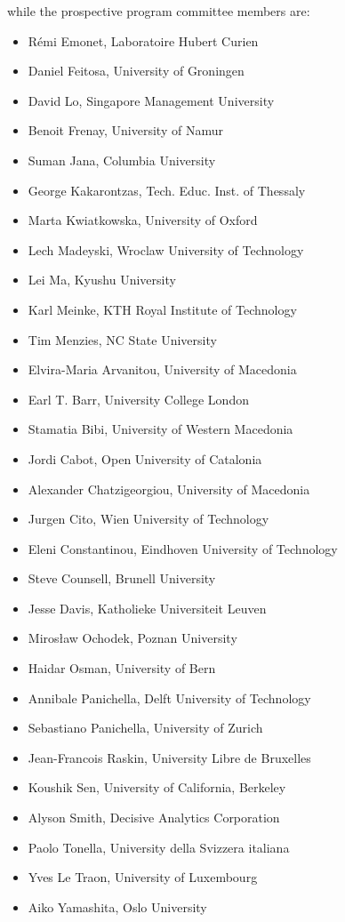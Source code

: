 \smallskip
\noindent while the prospective program committee members are:

\begin{itemize}[topsep=0.5em, itemsep=0.5em]
	\item Rémi Emonet, Laboratoire Hubert Curien
	\item Daniel Feitosa, University of Groningen
    \item David Lo, Singapore Management University
	\item Benoit Frenay, University of Namur
	\item Suman Jana, Columbia University
    \item George Kakarontzas, Tech. Educ. Inst. of Thessaly
	\item Marta Kwiatkowska, University of Oxford
	\item Lech Madeyski, Wroclaw University of Technology
    \item Lei Ma, Kyushu University
	\item Karl Meinke, KTH Royal Institute of Technology
	\item Tim Menzies, NC State University
	\item Elvira-Maria Arvanitou, University of Macedonia
	\item Earl T. Barr, University College London
	\item Stamatia Bibi, University of Western Macedonia
	\item Jordi Cabot, Open University of Catalonia
	\item Alexander Chatzigeorgiou, University of Macedonia
	\item Jurgen Cito, Wien University of Technology
	\item Eleni Constantinou, Eindhoven University of Technology
	\item Steve Counsell, Brunell University
	\item Jesse Davis, Katholieke Universiteit Leuven
	\item Mirosław Ochodek, Poznan University
	\item Haidar Osman, University of Bern
	\item Annibale Panichella, Delft University of Technology
	\item Sebastiano Panichella, University of Zurich
	\item Jean-Francois Raskin, University Libre de Bruxelles
	\item Koushik Sen, University of California, Berkeley
	\item Alyson Smith, Decisive Analytics Corporation
	\item Paolo Tonella, University della Svizzera italiana
	\item Yves Le Traon, University of Luxembourg
	\item Aiko Yamashita, Oslo University
\end{itemize}
